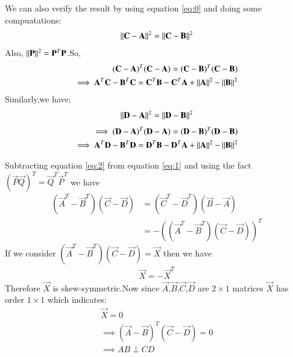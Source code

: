 \documentclass[journal,12pt,twocolumn]{IEEEtran}
\begin{document}
We can also verify the result by using equation \ref{eq:0} and doing some compuatations:
\begin{align}
\lVert\mathbf{C}-\mathbf{A}\rVert^2 = \lVert\mathbf{C}-\mathbf{B}\rVert^2
\end{align}
Also, $\lVert\mathbf{P}\rVert^2=\mathbf{P}^T\mathbf{P}$.So,
\begin{align}
(\mathbf{C}-\mathbf{A})^T(\mathbf{C}-\mathbf{A})=(\mathbf{C}-\mathbf{B})^T(\mathbf{C}-\mathbf{B})
\\
\implies \mathbf{A}^T\mathbf{C}-\mathbf{B}^T\mathbf{C}=\mathbf{C}^T\mathbf{B}-\mathbf{C}^T\mathbf{A}+\lVert\mathbf{A}\rVert^2-\lVert\mathbf{B}\rVert^2 \label{eq:1}
\end{align}
Similarly,we have:
\begin{align}
\lVert\mathbf{D}-\mathbf{A}\rVert^2 = \lVert\mathbf{D}-\mathbf{B}\rVert^2
\end{align}
\begin{align}
\implies(\mathbf{D}-\mathbf{A})^T(\mathbf{D}-\mathbf{A})=(\mathbf{D}-\mathbf{B})^T(\mathbf{D}-\mathbf{B})
\\
\implies \mathbf{A}^T\mathbf{D}-\mathbf{B}^T\mathbf{D}=\mathbf{D}^T\mathbf{B}-\mathbf{D}^T\mathbf{A}+\lVert\mathbf{A}\rVert^2-\lVert\mathbf{B}\rVert^2 \label{eq:2}
\end{align}

Subtracting equation \ref{eq:2} from equation \ref{eq:1} and using the fact $(\vec{P}\vec{Q})^T=\vec{Q}^T\vec{P}^T$ we have
\begin{align}
(\vec{A}^T-\vec{B}^T)(\vec{C}-\vec{D})
&=(\vec{C}^T-\vec{D}^T)(\vec{B}-\vec{A})
\\
&=-((\vec{A}^T-\vec{B}^T)(\vec{C}-\vec{D}))^T
\end{align}
If we consider $(\vec{A}^T-\vec{B}^T)(\vec{C}-\vec{D})=\vec{X}$
then we have
\begin{align}
\vec{X}= -{\vec{X}}^T
\end{align}
Therefore $\vec{X}$ is skew-symmetric.Now since $\vec{A}$,$\vec{B}$,$\vec{C}$,$\vec{D}$ are $ 2\times1$ matrices $\vec{X}$ has order $1\times1$ which indicates:
\begin{align}
\vec{X}= 0
\\
\implies (\vec{A}-\vec{B})^T(\vec{C}-\vec{D})=0
\\
\implies AB\perp CD
\end{align}
\end{document}
